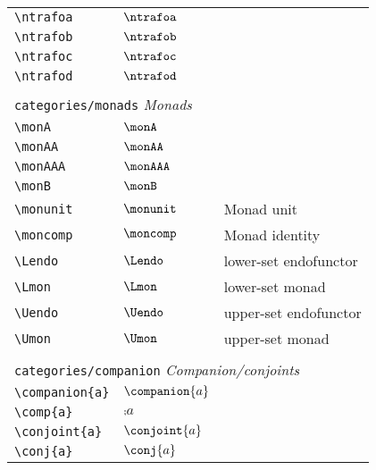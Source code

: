 \begin{longtable}{lll}
 {\color[rgb]{0.5,0.5,0.5}\texttt{\textbackslash ntrafoa}} & $\ntrafoa$ & \\ 
 {\color[rgb]{0.5,0.5,0.5}\texttt{\textbackslash ntrafob}} & $\ntrafob$ & \\ 
 {\color[rgb]{0.5,0.5,0.5}\texttt{\textbackslash ntrafoc}} & $\ntrafoc$ & \\ 
 {\color[rgb]{0.5,0.5,0.5}\texttt{\textbackslash ntrafod}} & $\ntrafod$ & \\ 
  &  & \\ 
 \multicolumn{3}{l}{{\color[rgb]{0.5,0.5,0.5}\texttt{categories/monads}} \emph{Monads}}\\ 
 \hline
{\color[rgb]{0.5,0.5,0.5}\texttt{\textbackslash monA}} & $\monA$ & \\ 
 {\color[rgb]{0.5,0.5,0.5}\texttt{\textbackslash monAA}} & $\monAA$ & \\ 
 {\color[rgb]{0.5,0.5,0.5}\texttt{\textbackslash monAAA}} & $\monAAA$ & \\ 
 {\color[rgb]{0.5,0.5,0.5}\texttt{\textbackslash monB}} & $\monB$ & \\ 
 {\color[rgb]{0.5,0.5,0.5}\texttt{\textbackslash monunit}} & $\monunit$ &  Monad unit\\ 
 {\color[rgb]{0.5,0.5,0.5}\texttt{\textbackslash moncomp}} & $\moncomp$ &  Monad identity\\ 
 {\color[rgb]{0.5,0.5,0.5}\texttt{\textbackslash Lendo}} & $\Lendo$ &  lower-set endofunctor\\ 
 {\color[rgb]{0.5,0.5,0.5}\texttt{\textbackslash Lmon}} & $\Lmon$ &  lower-set monad\\ 
 {\color[rgb]{0.5,0.5,0.5}\texttt{\textbackslash Uendo}} & $\Uendo$ &  upper-set endofunctor\\ 
 {\color[rgb]{0.5,0.5,0.5}\texttt{\textbackslash Umon}} & $\Umon$ &  upper-set monad\\ 
  &  & \\ 
 \multicolumn{3}{l}{{\color[rgb]{0.5,0.5,0.5}\texttt{categories/companion}} \emph{Companion/conjoints}}\\ 
 \hline
{\color[rgb]{0.5,0.5,0.5}\texttt{\textbackslash companion\{a\}}} & $\companion{a}$ & \\ 
 {\color[rgb]{0.5,0.5,0.5}\texttt{\textbackslash comp\{a\}}} & $\comp{a}$ & \\ 
 {\color[rgb]{0.5,0.5,0.5}\texttt{\textbackslash conjoint\{a\}}} & $\conjoint{a}$ & \\ 
 {\color[rgb]{0.5,0.5,0.5}\texttt{\textbackslash conj\{a\}}} & $\conj{a}$ & \\ 

\end{longtable}
